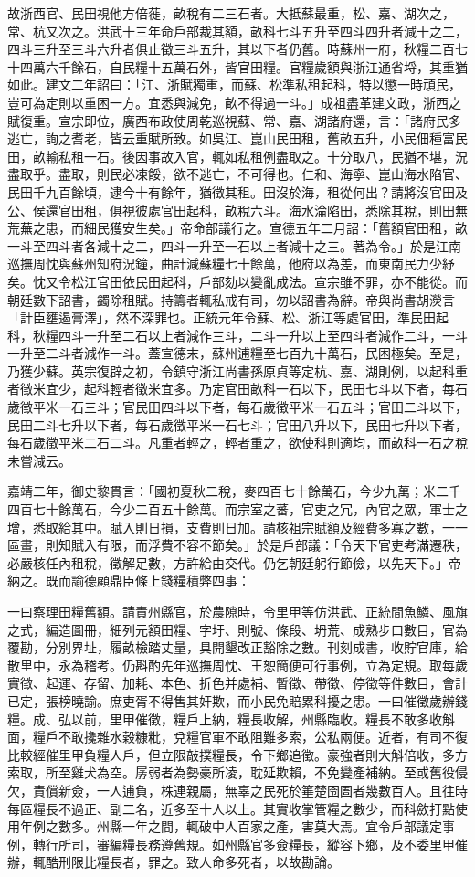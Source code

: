 故浙西官、民田視他方倍蓰，畝稅有二三石者。大抵蘇最重，松、嘉、湖次之，常、杭又次之。洪武十三年命戶部裁其額，畝科七斗五升至四斗四升者減十之二，四斗三升至三斗六升者俱止徵三斗五升，其以下者仍舊。時蘇州一府，秋糧二百七十四萬六千餘石，自民糧十五萬石外，皆官田糧。官糧歲額與浙江通省埒，其重猶如此。建文二年詔曰：「江、浙賦獨重，而蘇、松準私租起科，特以懲一時頑民，豈可為定則以重困一方。宜悉與減免，畝不得過一斗。」成祖盡革建文政，浙西之賦復重。宣宗即位，廣西布政使周乾巡視蘇、常、嘉、湖諸府還，言：「諸府民多逃亡，詢之耆老，皆云重賦所致。如吳江、崑山民田租，舊畝五升，小民佃種富民田，畝輸私租一石。後因事故入官，輒如私租例盡取之。十分取八，民猶不堪，況盡取乎。盡取，則民必凍餒，欲不逃亡，不可得也。仁和、海寧、崑山海水陷官、民田千九百餘頃，逮今十有餘年，猶徵其租。田沒於海，租從何出？請將沒官田及公、侯還官田租，俱視彼處官田起科，畝稅六斗。海水淪陷田，悉除其稅，則田無荒蕪之患，而細民獲安生矣。」帝命部議行之。宣德五年二月詔：「舊額官田租，畝一斗至四斗者各減十之二，四斗一升至一石以上者減十之三。著為令。」於是江南巡撫周忱與蘇州知府況鐘，曲計減蘇糧七十餘萬，他府以為差，而東南民力少紓矣。忱又令松江官田依民田起科，戶部劾以變亂成法。宣宗雖不罪，亦不能從。而朝廷數下詔書，蠲除租賦。持籌者輒私戒有司，勿以詔書為辭。帝與尚書胡濙言「計臣壅遏膏澤」，然不深罪也。正統元年令蘇、松、浙江等處官田，準民田起科，秋糧四斗一升至二石以上者減作三斗，二斗一升以上至四斗者減作二斗，一斗一升至二斗者減作一斗。蓋宣德末，蘇州逋糧至七百九十萬石，民困極矣。至是，乃獲少蘇。英宗復辟之初，令鎮守浙江尚書孫原貞等定杭、嘉、湖則例，以起科重者徵米宜少，起科輕者徵米宜多。乃定官田畝科一石以下，民田七斗以下者，每石歲徵平米一石三斗；官民田四斗以下者，每石歲徵平米一石五斗；官田二斗以下，民田二斗七升以下者，每石歲徵平米一石七斗；官田八升以下，民田七升以下者，每石歲徵平米二石二斗。凡重者輕之，輕者重之，欲使科則適均，而畝科一石之稅未嘗減云。

嘉靖二年，御史黎貫言：「國初夏秋二稅，麥四百七十餘萬石，今少九萬；米二千四百七十餘萬石，今少二百五十餘萬。而宗室之蕃，官吏之冗，內官之眾，軍士之增，悉取給其中。賦入則日損，支費則日加。請核祖宗賦額及經費多寡之數，一一區畫，則知賦入有限，而浮費不容不節矣。」於是戶部議：「令天下官吏考滿遷秩，必嚴核任內租稅，徵解足數，方許給由交代。仍乞朝廷躬行節儉，以先天下。」帝納之。既而諭德顧鼎臣條上錢糧積弊四事：

一曰察理田糧舊額。請責州縣官，於農隙時，令里甲等仿洪武、正統間魚鱗、風旗之式，編造圖冊，細列元額田糧、字圩、則號、條段、坍荒、成熟步口數目，官為覆勘，分別界址，履畝檢踏丈量，具開墾改正豁除之數。刊刻成書，收貯官庫，給散里中，永為稽考。仍斟酌先年巡撫周忱、王恕簡便可行事例，立為定規。取每歲實徵、起運、存留、加耗、本色、折色并處補、暫徵、帶徵、停徵等件數目，會計已定，張榜曉諭。庶吏胥不得售其奸欺，而小民免賠累科擾之患。一曰催徵歲辦錢糧。成、弘以前，里甲催徵，糧戶上納，糧長收解，州縣臨收。糧長不敢多收斛面，糧戶不敢攙雜水穀糠粃，兌糧官軍不敢阻難多索，公私兩便。近者，有司不復比較經催里甲負糧人戶，但立限敲撲糧長，令下鄉追徵。豪強者則大斛倍收，多方索取，所至雞犬為空。孱弱者為勢豪所凌，耽延欺賴，不免變產補納。至或舊役侵欠，責償新僉，一人逋負，株連親屬，無辜之民死於箠楚囹圄者幾數百人。且往時每區糧長不過正、副二名，近多至十人以上。其實收掌管糧之數少，而科斂打點使用年例之數多。州縣一年之間，輒破中人百家之產，害莫大焉。宜令戶部議定事例，轉行所司，審編糧長務遵舊規。如州縣官多僉糧長，縱容下鄉，及不委里甲催辦，輒酷刑限比糧長者，罪之。致人命多死者，以故勘論。

